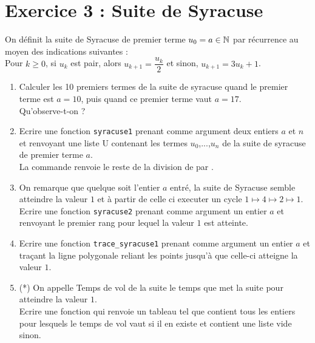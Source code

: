 \documentclass[11pt,a4paper,french,twoside]{PMCours}
\begin{document}
\section*{Exercice 3 : Suite de Syracuse}
\noindent
On d\'efinit la suite de Syracuse de premier terme $u_0=a\in\operatorname{\mathbb{N}}$ par r\'ecurrence au moyen des indications suivantes :\\
Pour $k\geq 0$, si $u_k$ est pair, alors $u_{k+1}=\dfrac {u_k}2$ et sinon, $u_{k+1}=3u_k+1$.
\begin{enumerate}
\item Calculer les 10 premiers termes de la suite de syracuse quand le premier terme est $a=10$, puis quand ce premier terme vaut $a=17$.\\
Qu'observe-t-on ? 
\item Ecrire une fonction \verb|syracuse1| prenant comme argument deux entiers $a$ et $n$ et renvoyant une liste U contenant les termes $u_0$,...,$u_n$ de la suite de syracuse de premier terme $a$.\\
La commande  renvoie le reste de la division de  par .
\item On remarque que quelque soit l'entier $a$ entr\'e, la suite de Syracuse semble atteindre la valeur $1$ et \`a partir de celle ci executer un cycle $1\mapsto 4\mapsto 2\mapsto 1$.\\
Ecrire une fonction \verb|syracuse2| prenant comme argument un entier $a$ et renvoyant le premier rang pour lequel la valeur $1$ est atteinte. 
\item Ecrire une fonction \verb|trace_syracuse1| prenant comme argument un entier $a$ et traçant la ligne polygonale reliant les points  jusqu'à que celle-ci atteigne la valeur $1$. 
\item (*) On appelle Temps de vol de la suite le temps que met la suite pour atteindre la valeur $1$.\\
Ecrire une fonction  qui renvoie un tableau  tel que  contient tous les entiers  pour lesquels le temps de vol vaut  si il en existe et contient une liste vide \code{[]} sinon.  
\end{enumerate}
\end{document}
